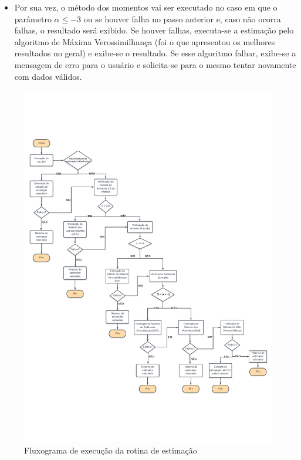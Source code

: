 \begin{itemize}
    \item Por sua vez, o método dos momentos vai ser executado no caso em que o parâmetro $\alpha \leq -3$ ou se houver falha no passo anterior e, caso não ocorra falhas, o resultado será exibido. Se houver falhas, executa-se a estimação pelo algoritmo de Máxima Verossimilhança (foi o que apresentou os melhores resultados no geral) e exibe-se o resultado. Se esse algoritmo falhar, exibe-se a mensagem de erro para o usuário e solicita-se para o mesmo tentar novamente com dados válidos.
\end{itemize}

\begin{figure}[H]
     \centering
     \includegraphics[width=\linewidth]{plots/FluxogramaDeExecucao-A4.pdf}
     \caption{Fluxograma de execução da rotina de estimação}
     \label{fig1}
\end{figure}


